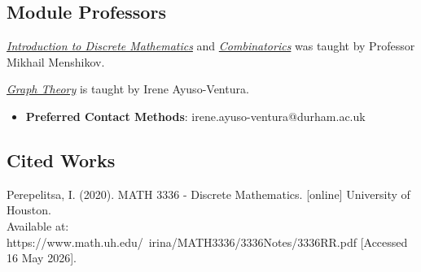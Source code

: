 \subsection{Module Professors}

\hyperref[dm:section:1.idm]{\textit{Introduction to Discrete Mathematics}} and \hyperref[dm:section:2.com]{\textit{Combinatorics}} was taught by Professor Mikhail Menshikov.
    
\hyperref[dm:section:3.gt]{\textit{Graph Theory}} is taught by Irene Ayuso-Ventura.
\begin{itemize}
    \item \textbf{Preferred Contact Methods}: irene.ayuso-ventura@durham.ac.uk
\end{itemize}

\subsection{Cited Works}

Perepelitsa, I. (2020). MATH 3336 - Discrete Mathematics. [online] University of Houston. \\ Available at: https://www.math.uh.edu/~irina/MATH3336/3336Notes/3336RR.pdf [Accessed 16 May 2026].\label{cit:recurrenceRelation}